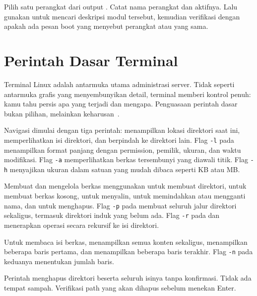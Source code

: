 \begin{challengebox}
Pilih satu perangkat dari output . Catat nama perangkat dan  aktifnya. Lalu gunakan  untuk mencari deskripsi modul tersebut, kemudian verifikasi dengan  apakah ada pesan boot yang menyebut perangkat atau  yang sama.
\end{challengebox}

\section{Perintah Dasar Terminal}
\label{sec:basic-commands}

Terminal Linux adalah antarmuka utama administrasi server. Tidak seperti antarmuka grafis yang menyembunyikan detail, terminal memberi kontrol penuh: kamu tahu persis apa yang terjadi dan mengapa. Penguasaan perintah dasar bukan pilihan, melainkan keharusan~\cite{shotts2019linux}.

Navigasi dimulai dengan tiga perintah:  menampilkan lokasi direktori saat ini,  memperlihatkan isi direktori, dan  berpindah ke direktori lain. Flag \texttt{-l} pada  menampilkan format panjang dengan permission, pemilik, ukuran, dan waktu modifikasi. Flag \texttt{-a} memperlihatkan berkas tersembunyi yang diawali titik. Flag \texttt{-h} menyajikan ukuran dalam satuan yang mudah dibaca seperti KB atau MB.

Membuat dan mengelola berkas menggunakan  untuk membuat direktori,  untuk membuat berkas kosong,  untuk menyalin,  untuk memindahkan atau mengganti nama, dan  untuk menghapus. Flag \texttt{-p} pada  membuat seluruh jalur direktori sekaligus, termasuk direktori induk yang belum ada. Flag \texttt{-r} pada  dan  menerapkan operasi secara rekursif ke isi direktori.

Untuk membaca isi berkas,  menampilkan semua konten sekaligus,  menampilkan beberapa baris pertama, dan  menampilkan beberapa baris terakhir. Flag \texttt{-n} pada keduanya menentukan jumlah baris.

\begin{warningbox}
Perintah  menghapus direktori beserta seluruh isinya tanpa konfirmasi. Tidak ada tempat sampah. Verifikasi path yang akan dihapus sebelum menekan Enter.
\end{warningbox}

